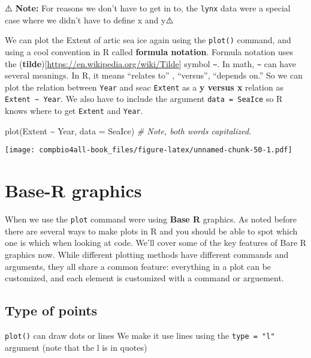 \documentclass[
]{book}
\newenvironment{Shaded}{\begin{snugshade}}{\end{snugshade}}
\newcommand{\AttributeTok}[1]{\textcolor[rgb]{0.77,0.63,0.00}{#1}}
\newcommand{\CommentTok}[1]{\textcolor[rgb]{0.56,0.35,0.01}{\textit{#1}}}
\newcommand{\FunctionTok}[1]{\textcolor[rgb]{0.00,0.00,0.00}{#1}}
\newcommand{\NormalTok}[1]{#1}
\newcommand{\SpecialCharTok}[1]{\textcolor[rgb]{0.00,0.00,0.00}{#1}}
\begin{document}
⚠️ \textbf{Note:} For reasons we don't have to get in to, the \texttt{lynx} data were a special case where we didn't have to define x and y⚠️

We can plot the Extent of artic sea ice again using the \texttt{plot()} command, and using a cool convention in R called \textbf{formula notation}. Formula notation uses the (\textbf{tilde}){[}\url{https://en.wikipedia.org/wiki/Tilde}{]} symbol \texttt{\textasciitilde{}}. In math, \texttt{\textasciitilde{}} can have several meanings. In R, it means ``relates to'' , ``versus'', ``depends on.'' So we can plot the relation between \texttt{Year} and seac \texttt{Extent} as a \textbf{y versus x} relation as \texttt{Extent\ \textasciitilde{}\ Year}. We also have to include the argument \texttt{data\ =\ SeaIce} so R knows where to get \texttt{Extent} and \texttt{Year}.

\begin{Shaded}
\begin{Highlighting}[]
\FunctionTok{plot}\NormalTok{(Extent }\SpecialCharTok{\textasciitilde{}}\NormalTok{ Year, }\AttributeTok{data =}\NormalTok{ SeaIce)  }\CommentTok{\# Note, both words capitalized.}
\end{Highlighting}
\end{Shaded}

\texttt{[image: compbio4all-book\_files/figure-latex/unnamed-chunk-50-1.pdf]}

\hypertarget{base-r-graphics}{%
\section{Base-R graphics}\label{base-r-graphics}}

When we use the \texttt{plot} command were using \textbf{Base R} graphics. As noted before there are several ways to make plots in R and you should be able to spot which one is which when looking at code. We'll cover some of the key features of Bare R graphics now. While different plotting methods have different commands and arguments, they all share a common feature: everything in a plot can be customized, and each element is customized with a command or arguement.

\hypertarget{type-of-points}{%
\subsection{Type of points}\label{type-of-points}}

\texttt{plot()} can draw dots or lines We make it use lines using the \texttt{type\ =\ "l"} argument (note that the l is in quotes)
\end{document}
